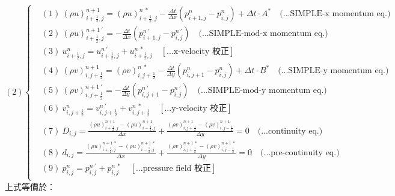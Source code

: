 \documentclass[12pt]{article}
\begin{document}
\begin{equation}
(2)
\left\{
\begin{aligned}
    &(1)\ (\rho u)_{i+\frac{1}{2},j}^{n+1} = (\rho u)_{i+\frac{1}{2},j}^{n\ *} - \frac{\Delta t}{\Delta x}(p_{i+1,j}^{n} - p_{i,j}^{n}) + \Delta t \cdot A^{*}  \quad \text{(...SIMPLE-x momentum eq.)}\\[1.5ex]
    &(2)\ (\rho u)_{i+\frac{1}{2},j}^{n+1\ \prime} = - \frac{\Delta t}{\Delta x}(p_{i+1,j}^{n\ \prime} - p_{i,j}^{n\ \prime})  \quad \text{(...SIMPLE-mod-x momentum eq.)}\\[1.5ex]
    &(3)\ u_{i+\frac{1}{2},j}^{n} = u_{i+\frac{1}{2},j}^{n\ \prime} + u_{i+\frac{1}{2},j}^{n\ *}  \quad \left[\text{...x-velocity 校正}\right]\\[1.5ex]
    &(4)\ (\rho v)_{i,j+\frac{1}{2}}^{n+1} = (\rho v)_{i,j+\frac{1}{2}}^{n\ *} - \frac{\Delta t}{\Delta y}(p_{i,j+1}^{n} - p_{i,j}^{n}) + \Delta t \cdot B^{*}  \quad \text{(...SIMPLE-y momentum eq.)}\\[1.5ex]
    &(5)\ (\rho v)_{i,j+\frac{1}{2}}^{n+1\ \prime} =  - \frac{\Delta t}{\Delta y}(p_{i,j+1}^{n\ \prime} - p_{i,j}^{n\ \prime}) \quad \text{(...SIMPLE-mod-y momentum eq.)}\\[1.5ex]
    &(6)\ v_{i,j+\frac{1}{2}}^{n} = v_{i,j+\frac{1}{2}}^{n\ \prime} + v_{i,j+\frac{1}{2}}^{n\ *} \quad \left[\text{...y-velocity 校正}\right]\\[1.5ex]
    &(7)\ D_{i,j} = \frac{(\rho u)_{i+\frac{1}{2},j}^{n+1} - (\rho u)_{i-\frac{1}{2},j}^{n+1}}{\Delta x} + \frac{(\rho v)_{i,j+\frac{1}{2}}^{n+1} - (\rho v)_{i,j-\frac{1}{2}}^{n+1}}{\Delta y} = 0 \quad \text{(...continuity eq.)}\\[1.5ex]
    &(8)\ d_{i,j} = \frac{(\rho u)_{i+\frac{1}{2},j}^{n+1\ *} - (\rho u)_{i-\frac{1}{2},j}^{n+1\ *}}{\Delta x} + \frac{(\rho v)_{i,j+\frac{1}{2}}^{n+1\ *} - (\rho v)_{i,j-\frac{1}{2}}^{n+1\ *}}{\Delta y} = 0 \quad \text{(...pre-continuity eq.)}\\[1.5ex]
    &(9)\ p_{i,j}^{n} = p_{i,j}^{n\ \prime} + p_{i,j}^{n\ *} \quad\left[\text{...pressure field 校正}\right]\\[1.5ex]
\end{aligned}
\right.
\end{equation}
\noindent 上式等價於：\\
\end{document}
